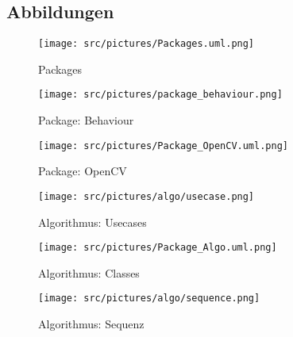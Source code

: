 \begin{appendix}

    \chapter{Abbildungen}

        \begin{figure}[ht]
            \centering
            \texttt{[image: src/pictures/Packages.uml.png]}
            \caption{Packages}
            \label{img:packages}
        \end{figure}

        \begin{figure}[ht]
            \centering
            \texttt{[image: src/pictures/package\_behaviour.png]}
            \caption{Package: Behaviour}
            \label{img:package:behaviour}
        \end{figure}

        \begin{figure}[ht]
            \centering
            \texttt{[image: src/pictures/Package\_OpenCV.uml.png]}
            \caption{Package: OpenCV}
            \label{img:package:ocv}
        \end{figure}

        \cleardoubleemptypage

        \begin{figure}[ht]
            \centering
            \texttt{[image: src/pictures/algo/usecase.png]}
            \caption{Algorithmus: Usecases}
            \label{img:algo:usecases}
        \end{figure}

        \cleardoubleemptypage

        \begin{figure}[ht]
            \centering
            \texttt{[image: src/pictures/Package\_Algo.uml.png]}
            \caption{Algorithmus: Classes}
            \label{img:algo:classes}
        \end{figure}

        \cleardoubleemptypage

        \begin{figure}[ht]
            \centering
            \texttt{[image: src/pictures/algo/sequence.png]}
            \caption{Algorithmus: Sequenz}
            \label{img:algo:sequence}
        \end{figure}

\end{appendix}
